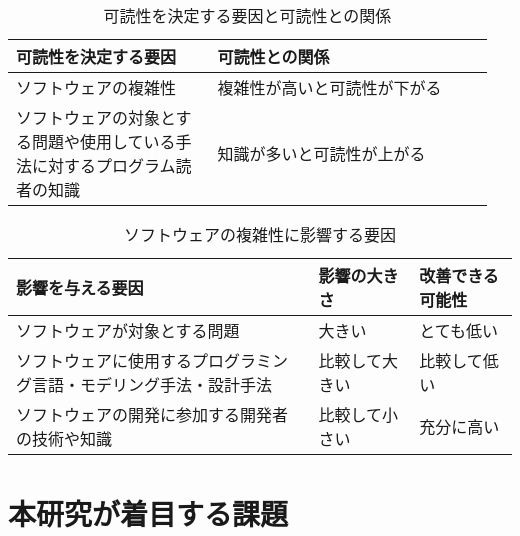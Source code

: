\begin{table}[!hbtp]
    \begin{center}
        \caption{可読性を決定する要因と可読性との関係}
        \begin{listliketab}
            \begin{tabular}{|p{0.4\linewidth}|p{0.55\linewidth}|}
                \hline
                可読性を決定する要因 & 可読性との関係 \\
                \hline
                \hline
                ソフトウェアの複雑性 & 複雑性が高いと可読性が下がる \\
                \hline
                ソフトウェアの対象とする問題や使用している手法に対するプログラム読者の知識 & 知識が多いと可読性が上がる \\
                \hline
            \end{tabular}
            \label{table:readability-relation}
        \end{listliketab}
    \end{center}
\end{table}

\begin{table}[!hbtp]
    \begin{center}
        \caption{ソフトウェアの複雑性に影響する要因}
        \begin{listliketab}
            \begin{tabular}{|p{0.6\linewidth}|p{0.2\linewidth}|p{0.2\linewidth}|}
                \hline
                影響を与える要因 & 影響の大きさ & 改善できる可能性 \\
                \hline
                \hline
                ソフトウェアが対象とする問題 & 大きい & とても低い \\
                \hline
                ソフトウェアに使用するプログラミング言語・モデリング手法・設計手法 & 比較して大きい & 比較して低い \\
                \hline
                ソフトウェアの開発に参加する開発者の技術や知識 & 比較して小さい & 充分に高い \\
                \hline
            \end{tabular}
            \label{table:complexity-elements}
        \end{listliketab}
    \end{center}
\end{table}

\afterpage{\clearpage}
\section{本研究が着目する課題}
\label{open-source:issue}


